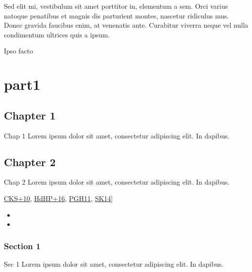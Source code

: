 \sphinxAtStartPar
Sed elit mi, vestibulum sit amet porttitor in, elementum a sem. Orci varius natoque penatibus et magnis dis parturient montes, nascetur ridiculus mus. Donec gravida faucibus enim, at venenatis ante. Curabitur viverra neque vel nulla condimentum ultrices quis a ipsum.

\begin{DUlineblock}{0em}
\item[] 
\end{DUlineblock}

\sphinxAtStartPar
Ipso facto

\sphinxstepscope


\part{part1}

\sphinxstepscope


\chapter{Chapter 1}
\label{\detokenize{part1/chap1:chapter-1}}\label{\detokenize{part1/chap1::doc}}
\sphinxAtStartPar
Chap 1 Lorem ipsum dolor sit amet, consectetur adipiscing elit. In dapibus.

\sphinxstepscope


\chapter{Chapter 2}
\label{\detokenize{part1/chap2:chapter-2}}\label{\detokenize{part1/chap2::doc}}
\sphinxAtStartPar
Chap 2 Lorem ipsum dolor sit amet, consectetur adipiscing elit. In dapibus.

\sphinxAtStartPar{[}\hyperlink{cite.part1/chap2:id5}{CKS+10}, \hyperlink{cite.part1/chap2:id3}{HdHP+16}, \hyperlink{cite.part1/chap2:id2}{PGH11}, \hyperlink{cite.part1/chap2:id4}{SK14}{]}
\begin{itemize}
\item{} 

\item{} 

\end{itemize}

\sphinxstepscope


\section{Section 1}
\label{\detokenize{part1/sec1:section-1}}\label{\detokenize{part1/sec1::doc}}
\sphinxAtStartPar
Sec 1 Lorem ipsum dolor sit amet, consectetur adipiscing elit. In dapibus.

